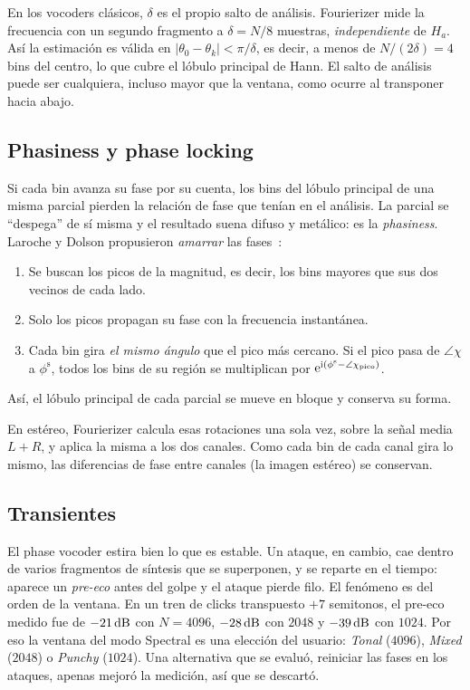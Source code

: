 En los vocoders clásicos, $\delta$ es el propio salto de análisis. Fourierizer mide la frecuencia
con un segundo fragmento a $\delta=N/8$ muestras, \emph{independiente} de $H_a$. Así la
estimación es válida en $|\theta_0-\theta_k|<\pi/\delta$, es decir, a menos de $N/(2\delta)=4$ bins
del centro, lo que cubre el lóbulo principal de Hann. El salto de análisis puede ser cualquiera,
incluso mayor que la ventana, como ocurre al transponer hacia abajo.

\subsection{Phasiness y phase locking}

Si cada bin avanza su fase por su cuenta, los bins del lóbulo principal de una misma parcial
pierden la relación de fase que tenían en el análisis. La parcial se ``despega'' de sí misma y el
resultado suena difuso y metálico: es la \emph{phasiness}. Laroche y Dolson propusieron
\emph{amarrar} las fases~\cite{laroche1999}:
\begin{enumerate}
  \item Se buscan los picos de la magnitud, es decir, los bins mayores que sus dos vecinos de cada
        lado.
  \item Solo los picos propagan su fase con la frecuencia instantánea.
  \item Cada bin gira \emph{el mismo ángulo} que el pico más cercano. Si el pico pasa de
        $\angle\chi$ a $\phi^{\text{s}}$, todos los bins de su región se multiplican por
        $\mathrm{e}^{\mathrm{i}(\phi^{\text{s}}-\angle\chi_{\text{pico}})}$.
\end{enumerate}
Así, el lóbulo principal de cada parcial se mueve en bloque y conserva su forma.

En estéreo, Fourierizer calcula esas rotaciones una sola vez, sobre la señal media $L+R$, y aplica
la misma a los dos canales. Como cada bin de cada canal gira lo mismo, las diferencias de fase entre
canales (la imagen estéreo) se conservan.

\subsection{Transientes}

El phase vocoder estira bien lo que es estable. Un ataque, en cambio, cae dentro de varios
fragmentos de síntesis que se superponen, y se reparte en el tiempo: aparece un \emph{pre-eco} antes
del golpe y el ataque pierde filo. El fenómeno es del orden de la ventana. En un tren de clicks
transpuesto $+7$ semitonos, el pre-eco medido fue de $-21\,\mathrm{dB}$ con $N=4096$, $-28\,\mathrm{dB}$ con $2048$ y
$-39\,\mathrm{dB}$ con $1024$. Por eso la ventana del modo Spectral es una elección del usuario: \emph{Tonal}
($4096$), \emph{Mixed} ($2048$) o \emph{Punchy} ($1024$). Una alternativa que se evaluó, reiniciar
las fases en los ataques, apenas mejoró la medición, así que se descartó.

